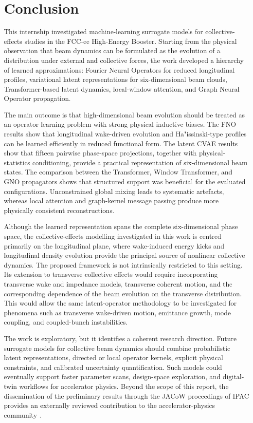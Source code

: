 \section{Conclusion}
\label{sec:conclusion}
This internship investigated machine-learning surrogate models for collective-effects studies in the FCC-ee High-Energy Booster. Starting from the physical observation that beam dynamics can be formulated as the evolution of a distribution under external and collective forces, the work developed a hierarchy of learned approximations: Fourier Neural Operators for reduced longitudinal profiles, variational latent representations for six-dimensional beam clouds, Transformer-based latent dynamics, local-window attention, and Graph Neural Operator propagation.

The main outcome is that high-dimensional beam evolution should be treated as an operator-learning problem with strong physical inductive biases. The FNO results show that longitudinal wake-driven evolution and Ha"issinski-type profiles can be learned efficiently in reduced functional form. The latent CVAE results show that fifteen pairwise phase-space projections, together with physical-statistics conditioning, provide a practical representation of six-dimensional beam states. The comparison between the Transformer, Window Transformer, and GNO propagators shows that structured support was beneficial for the evaluated configurations. Unconstrained global mixing leads to systematic artefacts, whereas local attention and graph-kernel message passing produce more physically consistent reconstructions.

Although the learned representation spans the complete six-dimensional phase space, the collective-effects modelling investigated in this work is centred primarily on the longitudinal plane, where wake-induced energy kicks and longitudinal density evolution provide the principal source of nonlinear collective dynamics. The proposed framework is not intrinsically restricted to this setting. Its extension to transverse collective effects would require incorporating transverse wake and impedance models, transverse coherent motion, and the corresponding dependence of the beam evolution on the transverse distribution. This would allow the same latent-operator methodology to be investigated for phenomena such as transverse wake-driven motion, emittance growth, mode coupling, and coupled-bunch instabilities.

The work is exploratory, but it identifies a coherent research direction. Future surrogate models for collective beam dynamics should combine probabilistic latent representations, directed or local operator kernels, explicit physical constraints, and calibrated uncertainty quantification. Such models could eventually support faster parameter scans, design-space exploration, and digital-twin workflows for accelerator physics. Beyond the scope of this report, the dissemination of the preliminary results through the JACoW proceedings of IPAC provides an externally reviewed contribution to the accelerator-physics community \cite{my_paper}.
